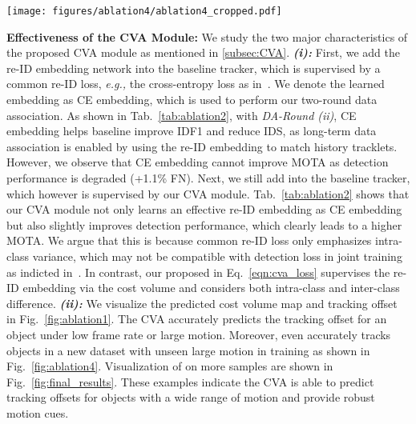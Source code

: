\documentclass[final]{cvpr}
\newcommand{\myparagraph}[1]{{\vspace{0.5em} \noindent \bf #1}}
\begin{document}
\begin{figure*}
	\centering
	\texttt{[image: figures/ablation4/ablation4\_cropped.pdf]}
	\caption{\textbf{Visualized  on nuScenes.} All models are only trained on MOT but tested on nuScenes, where nuScenes has much larger object motions than MOT. TraDeS successfully tracks objects with unseen large motion in training dataset, but baseline and CenterTrack fail.}
	\label{fig:ablation4}
	\vspace{-3mm}
\end{figure*}



\vspace{-1mm}
\myparagraph{Effectiveness of the CVA Module:} We study the two major characteristics of the proposed CVA module as mentioned in \cref{subsec:CVA}.  \textbf{\emph{(i):}} First, we add the re-ID embedding network  into the baseline tracker, which is supervised by a common re-ID loss, \emph{e.g.,} the cross-entropy loss  as in~\cite{wang2019towards,zhang2020fairmot}. We denote the learned embedding as CE embedding, which is used to perform our two-round data association. As shown in Tab.~\ref{tab:ablation2}, with {\emph{DA-Round (ii)}}, CE embedding helps baseline improve IDF1 and reduce IDS, as long-term data association is enabled by using the re-ID embedding to match history tracklets. However, we observe that CE embedding cannot improve MOTA as detection performance is degraded (+1.1\% FN). Next, we still add  into the baseline tracker, which however is supervised by our CVA module. Tab.~\ref{tab:ablation2} shows that our CVA module not only learns an effective re-ID embedding as CE embedding but also slightly improves detection performance, which clearly leads to a higher MOTA. We argue that this is because common re-ID loss only emphasizes intra-class variance, which may not be compatible with detection loss in joint training as indicted in~\cite{chen2018person}. In contrast, our proposed  in Eq.~\ref{eqn:cva_loss} supervises the re-ID embedding via the cost volume and considers both intra-class and inter-class difference.
\textbf{\emph{(ii):}} We visualize the predicted cost volume map  and tracking offset  in Fig.~\ref{fig:ablation1}. The CVA accurately predicts the tracking offset for an object under low frame rate or large motion. Moreover,  even accurately tracks objects in a new dataset with unseen large motion in training as shown in Fig.~\ref{fig:ablation4}. Visualization of  on more samples are shown in Fig.~\ref{fig:final_results}. These examples indicate the CVA is able to predict tracking offsets for objects with a wide range of motion and provide robust motion cues.
\end{document}
